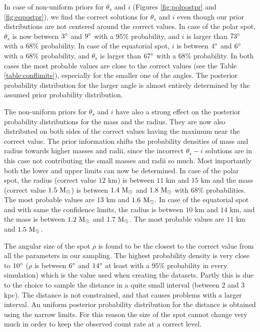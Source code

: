 \documentclass{wihuri}
\def\msun{{\rm M_{\odot}}}
\def\thetas{\theta_{s}}
\begin{document}
In case of non-uniform priors for $\thetas$ and $i$ (Figures \ref{fig:polpostpr} and \ref{fig:eqpostpr}), we find the correct solutions for $\thetas$ and $i$ even though our prior distributions are not centered  around the correct values. In case of the polar spot, $\thetas$ is now between $3 \degree$ and $9 \degree$ with a $95 \%$ probability, and $i$ is larger than $73 \degree$ with a $68 \%$ probability. In case of the equatorial spot, $i$ is between $4 \degree$ and $6 \degree$ with a $68 \%$ probability, and $\thetas$ is larger than $67 \degree$ with a $68 \%$ probability. In both cases the most probable values are close to the correct values (see the Table \ref{table:conflimits}), especially for the smaller one of the angles. The posterior probability distribution for the larger angle is almost entirely determined by the assumed prior probability distribution.  

The non-uniform priors for $\thetas$ and $i$ have also a strong effect on the posterior probability distributions for the mass and the radius. They are now also distributed on both sides of the correct values having the maximum near the correct value. The prior information shifts the probability densities of mass and radius towards higher masses and radii, since the incorrect $\thetas - i$ solutions are in this case not contributing the small masses and radii so much. Most importantly both the lower and upper limits can now be determined. In case of the polar spot, the radius (correct value $12$ km) is between $11$ km and $15$ km and the mass (correct value $1.5 ~\msun$) is between $1.4 ~\msun$ and $1.8 ~\msun$ with $68 \%$ probabilities. The most probable values are $13$ km and $1.6 ~\msun$. In case of the equatorial spot and with same the confidence limits, the radius is between $10$ km and $14$ km, and the mass is between $1.2 ~\msun$ and $1.7 ~\msun$. The most probable values are $11$ km and $1.5 ~\msun$. 

The angular size of the spot $\rho$ is found to be the closest to the correct value from all the  parameters in our sampling. The highest probability density is very close to $10 \degree$ ($\rho$ is between $6 \degree$ and $14 \degree$ at least with a $95 \%$ probability in every simulation) which is the value used when creating the datasets. Partly this is due to the choice to sample the distance in a quite small interval (between $2$ and $3$ kpc). The distance is not constrained, and that causes problems with a larger interval. An uniform posterior probability distribution for the distance is obtained using the narrow limits. For this reason the size of the spot cannot change very much in order to keep the observed count rate at a correct level.
\end{document}
